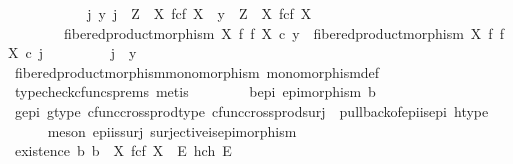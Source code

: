\begin{isabellebody}
\ \ \ \ \isamarkupfalse%
\isanewline
\isanewline
\ \ \ \ \isamarkupfalse%
\ {\isachardoublequoteopen}{\isasymAnd}\ j\ y{\isachardot}{\kern0pt}\ j\ {\isacharcolon}{\kern0pt}\ Z\ {\isasymrightarrow}\ X\ \isactrlbsub f\isactrlesub {\isasymtimes}\isactrlsub c\isactrlbsub f\isactrlesub \ X\ {\isasymLongrightarrow}\ y\ {\isacharcolon}{\kern0pt}\ Z\ {\isasymrightarrow}\ X\ \isactrlbsub f\isactrlesub {\isasymtimes}\isactrlsub c\isactrlbsub f\isactrlesub \ X\ {\isasymLongrightarrow}\isanewline
\ \ \ \ \ \ \ \ fibered{\isacharunderscore}{\kern0pt}product{\isacharunderscore}{\kern0pt}morphism\ X\ f\ f\ X\ {\isasymcirc}\isactrlsub c\ y\ {\isacharequal}{\kern0pt}\ fibered{\isacharunderscore}{\kern0pt}product{\isacharunderscore}{\kern0pt}morphism\ X\ f\ f\ X\ {\isasymcirc}\isactrlsub c\ j\ {\isasymLongrightarrow}\isanewline
\ \ \ \ \ \ \ \ j\ {\isacharequal}{\kern0pt}\ y{\isachardoublequoteclose}\isanewline
\ \ \ \ \ \ \isamarkupfalse%
\ fibered{\isacharunderscore}{\kern0pt}product{\isacharunderscore}{\kern0pt}morphism{\isacharunderscore}{\kern0pt}monomorphism\ monomorphism{\isacharunderscore}{\kern0pt}def{}\ \isamarkupfalse%
\ {\isacharparenleft}{\kern0pt}typecheck{\isacharunderscore}{\kern0pt}cfuncs{\isacharunderscore}{\kern0pt}prems{\isacharcomma}{\kern0pt}\ metis{\isacharparenright}{\kern0pt}\isanewline
\ \ \isamarkupfalse%
\isanewline
\ \ \isamarkupfalse%
\ \isamarkupfalse%
\ b{\isacharunderscore}{\kern0pt}epi{\isacharcolon}{\kern0pt}\ {\isachardoublequoteopen}epimorphism\ b{\isachardoublequoteclose}\isanewline
\ \ \ \ \isamarkupfalse%
\ g{\isacharunderscore}{\kern0pt}epi\ g{\isacharunderscore}{\kern0pt}type\ cfunc{\isacharunderscore}{\kern0pt}cross{\isacharunderscore}{\kern0pt}prod{\isacharunderscore}{\kern0pt}type\ cfunc{\isacharunderscore}{\kern0pt}cross{\isacharunderscore}{\kern0pt}prod{\isacharunderscore}{\kern0pt}surj\ \ pullback{\isacharunderscore}{\kern0pt}of{\isacharunderscore}{\kern0pt}epi{\isacharunderscore}{\kern0pt}is{\isacharunderscore}{\kern0pt}epi{}\ h{\isacharunderscore}{\kern0pt}type\isanewline
\ \ \ \ \isamarkupfalse%
\ {\isacharparenleft}{\kern0pt}meson\ epi{\isacharunderscore}{\kern0pt}is{\isacharunderscore}{\kern0pt}surj\ surjective{\isacharunderscore}{\kern0pt}is{\isacharunderscore}{\kern0pt}epimorphism{\isacharparenright}{\kern0pt}\isanewline
\isanewline
\ \ \isamarkupfalse%
\ existence{\isacharcolon}{\kern0pt}\ {\isachardoublequoteopen}{\isasymexists}b{\isachardot}{\kern0pt}\ b\ {\isacharcolon}{\kern0pt}\ X\ \isactrlbsub f\isactrlesub {\isasymtimes}\isactrlsub c\isactrlbsub f\isactrlesub \ X\ {\isasymrightarrow}\ E\ \isactrlbsub h\isactrlesub {\isasymtimes}\isactrlsub c\isactrlbsub h\isactrlesub \ E\ {\isasymand}\isanewline

\end{isabellebody}
